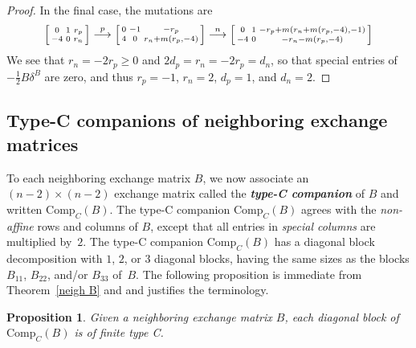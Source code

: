 \documentclass{amsart}
\newtheorem{proposition}{Proposition}[section]
\theoremstyle{definition}
\theoremstyle{remark}
\numberwithin{equation}{section}
\newcommand{\newword}[1]{\textbf{\emph{#1}}}
\newcommand{\0}{{\mathbf{0}}}
\newcommand{\Comp}{\mathrm{Comp}_C}
\begin{document}
\begin{proof}
In the final case, the mutations are
\[\begin{bsmallmatrix*}
0 & 1 & r_p\\
-4 & 0 &r_n
\end{bsmallmatrix*}\overset{p}{\longrightarrow} 
\begin{bsmallmatrix*}
0 & -1 & -r_p\\
4 & 0 &r_n+m(r_p,-4)
\end{bsmallmatrix*}\overset{n}{\longrightarrow} 
\begin{bsmallmatrix*}
0 & 1 &-r_p+m(r_n+m(r_p,-4),-1)\\
-4 & 0 &-r_n-m(r_p,-4)
\end{bsmallmatrix*}
\]
We see that $r_n=-2r_p\ge0$ and $2d_p=r_n=-2r_p=d_n$, so that special entries of~$-\frac12B\delta^B$ are zero, and thus $r_p=-1$, $r_n=2$, $d_p=1$, and $d_n=2$.
\end{proof}

\subsection{Type-C companions of neighboring exchange matrices}\label{type C}
To each neighboring exchange matrix $B$, we now associate an $(n-2)\times(n-2)$ exchange matrix called the \newword{type-C companion} of $B$ and written $\Comp(B)$.
The type-C companion $\Comp(B)$ agrees with the \emph{non-affine} rows and columns of $B$, except that all entries in \emph{special columns} are multiplied by~$2$.
The type-C companion $\Comp(B)$ has a diagonal block decomposition with $1$, $2$, or $3$ diagonal blocks, having the same sizes as the blocks $B_{11}$, $B_{22}$, and/or $B_{33}$ of~$B$.
The following proposition is immediate from Theorem~\ref{neigh B} and \cite[Proposition~3.3]{NS14} and justifies the terminology.

\begin{proposition}\label{Comp is C}
Given a neighboring exchange matrix $B$, each diagonal block of $\Comp(B)$ is of finite type C.
\end{proposition}
%
\end{document}

